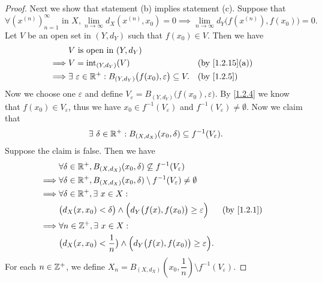 \begin{proof}
  Next we show that statement (b) implies statement (c).
  Suppose that
  \[
    \forall (x^{(n)})_{n = 1}^\infty \text{ in } X, \lim_{n \to \infty} d_X(x^{(n)}, x_0) = 0 \implies \lim_{n \to \infty} d_Y\big(f(x^{(n)}), f(x_0)\big) = 0.
  \]
  Let \(V\) be an open set in \((Y, d_Y)\) such that \(f(x_0) \in V\).
  Then we have
  \begin{align*}
             & V \text{ is open in } (Y, d_Y)                                                                                           \\
    \implies & V = \text{int}_{(Y, d_Y)}(V)                                                           &  & \text{(by \cref{1.2.15}(a))} \\
    \implies & \exists\ \varepsilon \in \R^+ : B_{(Y, d_Y)}\big(f(x_0), \varepsilon\big) \subseteq V. &  & \text{(by \cref{1.2.5})}
  \end{align*}
  Now we choose one \(\varepsilon\) and define \(V_\varepsilon = B_{(Y, d_Y)}\big(f(x_0), \varepsilon\big)\).
  By \cref{1.2.4} we know that \(f(x_0) \in V_\varepsilon\), thus we have \(x_0 \in f^{-1}(V_\varepsilon)\) and \(f^{-1}(V_\varepsilon) \neq \emptyset\).
  Now we claim that
  \[
    \exists\ \delta \in \mathbb{R}^+ : B_{(X, d_X)}(x_0, \delta) \subseteq f^{-1}(V_\varepsilon).
  \]
  Suppose the claim is false.
  Then we have
  \begin{align*}
             & \forall \delta \in \R^+, B_{(X, d_X)}(x_0, \delta) \not\subseteq f^{-1}(V_\varepsilon)                                          \\
    \implies & \forall \delta \in \R^+, B_{(X, d_X)}(x_0, \delta) \setminus f^{-1}(V_\varepsilon) \neq \emptyset                               \\
    \implies & \forall \delta \in \R^+, \exists\ x \in X :                                                                                     \\
             & \big(d_X(x, x_0) < \delta\big) \land \Big(d_Y\big(f(x), f(x_0)\big) \geq \varepsilon\Big)         &  & \text{(by \cref{1.2.1})} \\
    \implies & \forall n \in \Z^+, \exists\ x \in X :                                                                                          \\
             & \big(d_X(x, x_0) < \dfrac{1}{n}\big) \land \Big(d_Y\big(f(x), f(x_0)\big) \geq \varepsilon\Big).
  \end{align*}
  For each \(n \in \mathbb{Z}^+\), we define \(X_n = B_{(X, d_X)}(x_0, \dfrac{1}{n}) \setminus f^{-1}(V_\varepsilon)\).

\end{proof}
